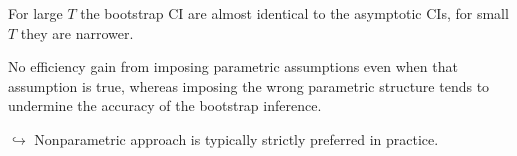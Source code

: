 
For large $T$ the bootstrap CI are almost identical to the asymptotic CIs, for small $T$ they are narrower.

No efficiency gain from imposing parametric assumptions even when that assumption is true,
  whereas imposing the wrong parametric structure tends to undermine the accuracy of the bootstrap inference.

$\hookrightarrow$ Nonparametric approach is typically strictly preferred in practice.
